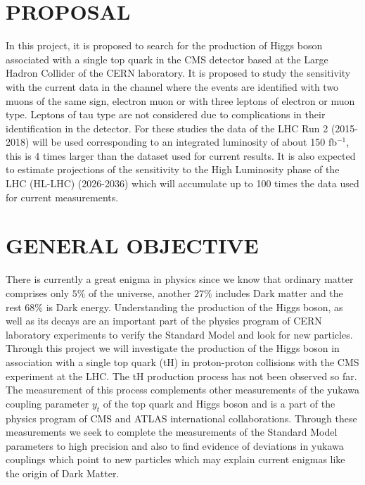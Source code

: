 \documentclass[final,3p]{CSP}
\begin{document}
\newpage
\section{PROPOSAL}

\onehalfspacing In this project, it is proposed to search for the production of Higgs boson associated with a single top quark in the CMS detector based at the Large Hadron Collider of the CERN laboratory.
It is proposed to study the sensitivity with the current data in the channel where the events are identified with two muons of the same sign, electron muon or with three leptons of electron or muon type.
Leptons of tau type are not considered due to complications in their identification in the detector.
For these studies the data of the LHC Run 2 (2015-2018) will be used corresponding to an integrated luminosity of about 150 fb$^{-1}$, this is 4 times larger than the dataset used for current results.
It is also expected to estimate projections of the sensitivity to the High Luminosity phase of the LHC (HL-LHC) (2026-2036) which will accumulate up to 100 times the data used for current measurements. 


\section{GENERAL OBJECTIVE}


\onehalfspacing There is currently a great enigma in physics since we know that ordinary matter comprises only $5\%$ of the universe, another $27\%$ includes Dark matter and the rest $68\%$ is Dark energy.
Understanding the production of the Higgs boson, as well as its decays are an important part of the physics program of CERN laboratory experiments to verify the Standard Model and look for new particles. Through this project we will investigate the production of the Higgs boson in association with a single top quark (tH) in proton-proton collisions with the CMS experiment at the LHC. The tH  production process has not been observed so far.
The measurement of this process complements other measurements of the yukawa coupling parameter $y_t$ of the top quark and Higgs boson and is a part of the physics program of CMS and ATLAS international collaborations. Through these measurements we seek to complete the measurements of the Standard Model parameters to high precision and also to find evidence of deviations in yukawa couplings which point to new particles which may explain current enigmas like the origin of Dark Matter.
\end{document}
